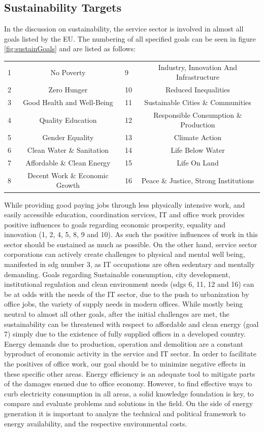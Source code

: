 \subsection{Sustainability Targets}\label{subsec:sustainabilityGoals}
In the discussion on sustainability, the service sector is involved in almost all goals listed by the EU. The numbering of all specified goals can be seen in figure \ref{fig:sustainGoals} and are listed as follows:\\
\begin{tabular*}{\textwidth}{lclc}
	\hline
	1 & No Poverty & 9 & Industry, Innovation And Infrastructure\\
	2 & Zero Hunger & 10 & Reduced Inequalities\\
	3 & Good Health and Well-Being & 11 & Sustainable Cities \& Communities\\
	4 & Quality Education &	12 & Responsible Consumption \& Production\\
	5 & Gender Equality & 13 & Climate Action\\
	6 & Clean Water \& Sanitation & 14 & Life Below Water\\
	7 & Affordable \& Clean Energy & 15 & Life On Land\\
	8 & Decent Work \& Economic Growth & 16 & Peace \& Justice, Strong Institutions\\
	\hline
\end{tabular*}
While providing good paying jobs through less physically intensive work, and easily accessible education, coordination services, IT and office work provides positive influences to goals regarding economic prosperity, equality and innovation (1, 2, 4, 5, 8, 9 and 10). As such the positive influences of work in this sector should be sustained as much as possible. On the other hand, service sector corporations can actively create challenges to physical and mental well being, manifested in \gls{sdg} number 3, as IT occupations are often sedentary and mentally demanding. Goals regarding Sustainable consumption, city development, institutional regulation and clean environment needs (\glspl{sdg} 6, 11, 12 and 16) can be at odds with the needs of the IT sector, due to the push to urbanization by office jobs, the variety of supply needs in modern offices. While mostly being neutral to almost all other goals, after the initial challenges are met, the sustainability can be threatened with respect to affordable and clean energy (goal 7) simply due to the existence of fully supplied offices in a developed country. Energy demands due to production, operation and demolition are a constant byproduct of economic activity in the service and IT sector. In order to facilitate the positives of office work, our goal should be to minimize negative effects in these specific other areas. Energy efficiency is an adequate tool to mitigate parts of the damages ensued due to office economy. However, to find effective ways to curb electricity consumption in all areas, a solid knowledge foundation is key, to compare and evaluate problems and solutions in the field. On the side of energy generation it is important to analyze the technical and political framework to energy availability, and the respective environmental costs.  
